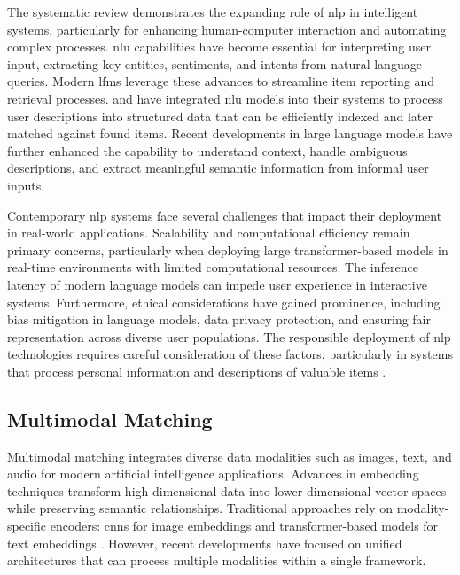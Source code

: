 The systematic review demonstrates the expanding role of \ac{nlp} in intelligent systems, particularly for enhancing human-computer interaction and automating complex processes. \ac{nlu} capabilities have become essential for interpreting user input, extracting key entities, sentiments, and intents from natural language queries. Modern \ac{lfms} leverage these advances to streamline item reporting and retrieval processes.  and  have integrated \ac{nlu} models into their systems to process user descriptions into structured data that can be efficiently indexed and later matched against found items. Recent developments in large language models have further enhanced the capability to understand context, handle ambiguous descriptions, and extract meaningful semantic information from informal user inputs.

Contemporary \ac{nlp} systems face several challenges that impact their deployment in real-world applications. Scalability and computational efficiency remain primary concerns, particularly when deploying large transformer-based models in real-time environments with limited computational resources. The inference latency of modern language models can impede user experience in interactive systems. Furthermore, ethical considerations have gained prominence, including bias mitigation in language models, data privacy protection, and ensuring fair representation across diverse user populations. The responsible deployment of \ac{nlp} technologies requires careful consideration of these factors, particularly in systems that process personal information and descriptions of valuable items \cite{Prawira2024}.


\subsection{Multimodal Matching} \label{subsec:multimodal-matching}

Multimodal matching integrates diverse data modalities such as images, text, and audio for modern artificial intelligence applications. Advances in embedding techniques transform high-dimensional data into lower-dimensional vector spaces while preserving semantic relationships. Traditional approaches rely on modality-specific encoders: \acp{cnn} for image embeddings and transformer-based models for text embeddings \cite{He2015, Devlin2019}. However, recent developments have focused on unified architectures that can process multiple modalities within a single framework.

